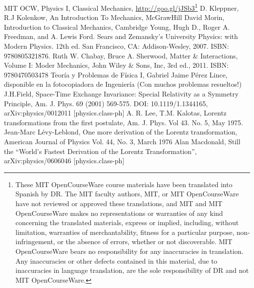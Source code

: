 \begin{thebibliography}{99}
 MIT OCW, Physics I, Classical Mechanics,  \url{http://goo.gl/jJSb3}\footnote{These MIT OpenCourseWare course materials have been translated into Spanish by DR. The MIT faculty authors, MIT, or MIT OpenCourseWare have not reviewed or approved these translations, and MIT and MIT OpenCourseWare makes no representations or warranties of any kind concerning the translated materials, express or implied, including, without limitation, warranties of merchantability, fitness for a particular purpose, non-infringement, or the absence of errors, whether or not discoverable. MIT OpenCourseWare bears no responsibility for any inaccuracies in translation. Any inaccuracies or other defects contained in this material, due to inaccuracies in language translation, are the sole responsibility of DR and not MIT OpenCourseWare.}
 D. Kleppner, R.J Kolenkow, An Introduction To Mechanics, McGrawHill
 David Morin, Introduction to Classical Mechanics, Cambridge
 Young, Hugh D., Roger A. Freedman, and A. Lewis Ford.
 Sears and Zemansky's University Physics: with Modern Physics. 12th ed. San Francisco, CA: Addison-Wesley, 2007. ISBN: 9780805321876.
 Ruth W. Chabay, Bruce A. Sherwood, Matter \& Interactions, Volume I: Moder Mechanics, John Wiley \& Sons, Inc, 3rd ed., 2011. ISBN: 9780470503478
 Teoría y Problemas de Física I, Gabriel Jaime Pérez Lince, disponible en la fotocopiadora de Ingeniería (Con muchos problemas resueltos!)
 J.H.Field, Space-Time Exchange Invariance: Special Relativity as a Symmetry Principle, Am. J. Phys. 69 (2001) 569-575. DOI:	10.1119/1.1344165, arXiv:physics/0012011 [physics.class-ph]
 A. R. Lee,  T.M. Kalotas, Lorentz transformations from the first postulate,
  Am. J. Phys. Vol 43. No. 5, May 1975.
 Jean-Marc Lévy-Leblond, One more derivation of the Lorentz transformation, American Journal of Physics Vol. 44, No. 3, March 1976
  Alan Macdonald, Still the ``World's Fastest Derivation of the Lorentz Transformation'',
  	arXiv:physics/0606046 [physics.class-ph]

\end{thebibliography}

